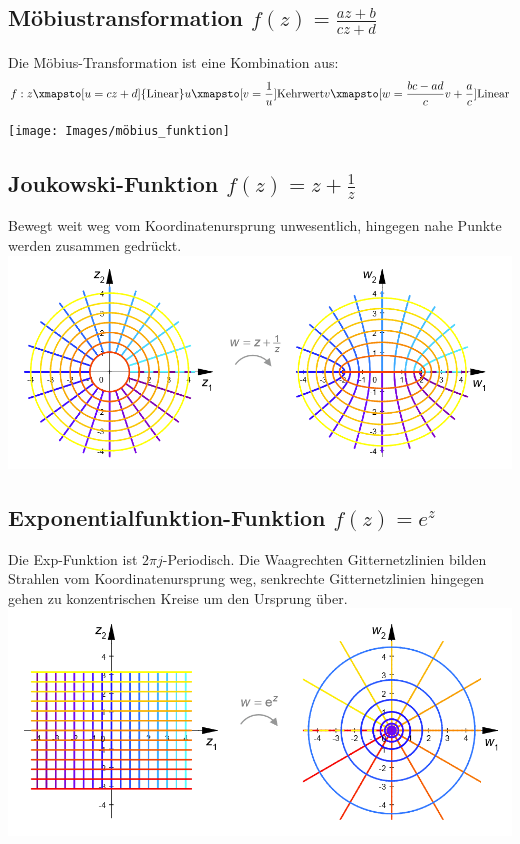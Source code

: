 \subsection{Möbiustransformation $f(z) = \frac{az+b}{cz+d}$}
Die Möbius-Transformation ist eine Kombination aus:
\[
f: z \xmapsto[u=cz+d]{\text{Linear}} u \xmapsto[v=\frac{1}{u}]{\text{Kehrwert}} v \xmapsto[w=\frac{bc-ad}{c}v+\frac{a}{c}]{\text{Linear}}
\]

\texttt{[image: Images/möbius\_funktion]}

\subsection{Joukowski-Funktion $f(z) = z + \frac{1}{z}$}
Bewegt weit weg vom Koordinatenursprung unwesentlich, hingegen nahe Punkte werden zusammen gedrückt.\\
\includegraphics[width=\columnwidth]{Images/joukowski_funktion}

\subsection{Exponentialfunktion-Funktion $f(z) = e^z$}
Die Exp-Funktion ist $2\pi j$-Periodisch. Die Waagrechten Gitternetzlinien bilden Strahlen vom Koordinatenursprung weg, senkrechte Gitternetzlinien hingegen gehen zu konzentrischen Kreise um den Ursprung über.\\
\includegraphics[width=\columnwidth]{Images/exp_funktion}


